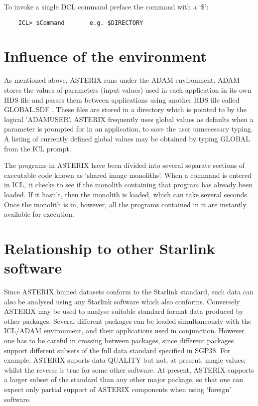 To invoke a single DCL command preface the command with a `\$':
\begin{verbatim}
    ICL> $Command       e.g. $DIRECTORY
\end{verbatim}

\section{Influence of the environment }

As mentioned above, ASTERIX runs under the ADAM environment. ADAM stores
the values of parameters (input values) used in each application in its own HDS 
file and passes them between applications using another HDS file called 
GLOBAL.SDF . These files are stored in a directory which is pointed to by
the logical 'ADAMUSER'. ASTERIX frequently uses global values as 
defaults when a parameter is prompted for in an application, to save the user
unnecessary typing. A listing of currently defined global values may be
obtained by typing GLOBAL from the ICL prompt. 

The programs in ASTERIX have been divided into several separate sections 
of executable code known as `shared image monoliths'.
When a command is entered in ICL, it checks to see if the monolith containing
that program has already been loaded. If it hasn't, then the monolith is 
loaded, which can take several seconds. Once the monolith is in, however,
all the programs contained in it are instantly available for execution.

\section{Relationship to other Starlink software }

Since ASTERIX binned datasets conform to the Starlink standard, such data can 
also be analysed using any Starlink software which also conforms.
Conversely ASTERIX may be used to analyse suitable standard format data
produced by other packages. Several different packages can be loaded
simultaneously with the ICL/ADAM environment, and their applications
used in conjunction. However one has to be careful in crossing between
packages, since different packages support different subsets of the
full data standard specified in SGP38. For example, ASTERIX suports data
QUALITY but not, at present, magic values; whilst the reverse is true for
some other software. At present, ASTERIX supports a larger subset of the 
standard than any other major package, so that one can expect only partial
support of ASTERIX components when using `foreign' software.

